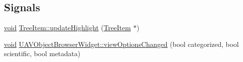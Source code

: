 \subsection*{Signals}
\begin{DoxyCompactItemize}
\item 
\hyperlink{group___u_a_v_objects_plugin_ga444cf2ff3f0ecbe028adce838d373f5c}{void} \hyperlink{group___u_a_v_object_browser_plugin_gab8702d2046500fbe3dd7cee66ebcda70}{Tree\-Item\-::update\-Highlight} (\hyperlink{class_tree_item}{Tree\-Item} $\ast$)
\item 
\hyperlink{group___u_a_v_objects_plugin_ga444cf2ff3f0ecbe028adce838d373f5c}{void} \hyperlink{group___u_a_v_object_browser_plugin_ga0fe8f51605067d863b1ac5bb6f6f5cbd}{U\-A\-V\-Object\-Browser\-Widget\-::view\-Options\-Changed} (bool categorized, bool scientific, bool metadata)
\end{DoxyCompactItemize}
